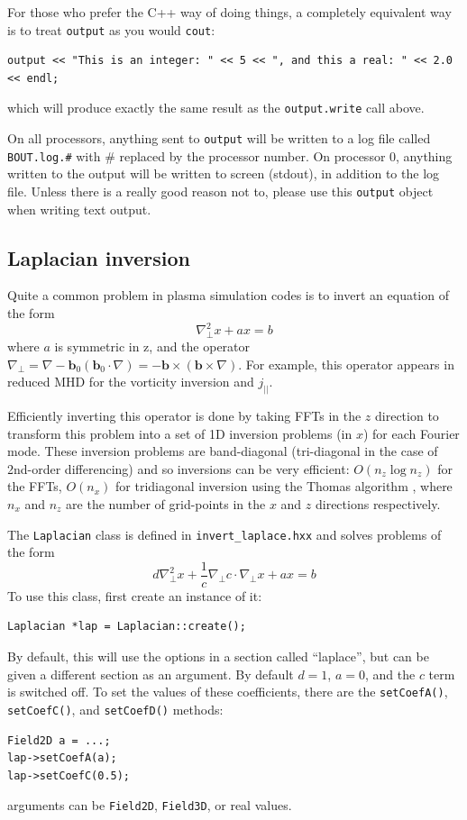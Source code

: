 \documentclass[12pt]{article}
\newcommand{\code}[1]{\texttt{#1}}
\begin{document}
For those who prefer the C++ way of doing things, a completely equivalent way is to
treat \code{output} as you would \code{cout}:
\begin{lstlisting}
output << "This is an integer: " << 5 << ", and this a real: " << 2.0 << endl;
\end{lstlisting}
which will produce exactly the same result as the \code{output.write} call above.

On all processors, anything sent to \code{output} will be written to a log file called
\texttt{BOUT.log.\#} with \# replaced by the processor number. On processor 0, anything
written to the output will be written to screen (stdout), in addition to the log file.
Unless there is a really good reason not to, please use this \code{output} object
when writing text output.

\subsection{Laplacian inversion}
Quite a common problem in plasma simulation codes is to invert an equation of the form
\[
\nabla_\perp^2 x + a x = b
\]
where $a$ is symmetric in z, and the operator $\nabla_\perp = \nabla - 
\mathbf{b}_0\left(\mathbf{b}_0\cdot\nabla\right) = -\mathbf{b\times} 
\left(\mathbf{b\times}\nabla\right)$. For example, this operator
appears in reduced MHD for the vorticity inversion and $j_||$.

Efficiently inverting this operator is done by taking FFTs in the $z$ direction
to transform this problem into a set of 1D inversion problems (in $x$) for each Fourier mode.
These inversion problems are band-diagonal (tri-diagonal in the case of 2nd-order differencing) and so
inversions can be very efficient: $O\left(n_z \log n_z\right)$ for the FFTs, $O\left(n_x\right)$ for tridiagonal inversion
using the Thomas algorithm \cite{press-1999}, where $n_x$ and $n_z$ are the number of grid-points
in the $x$ and $z$ directions respectively.

The \lstinline!Laplacian! class is defined in \texttt{invert\_laplace.hxx} and solves
problems of the form
\[
d\nabla_\perp^2 x + \frac{1}{c}\nabla_\perp c \cdot\nabla_\perp x + a x = b
\]
To use this class, first create an instance of it:
\begin{lstlisting}
Laplacian *lap = Laplacian::create();
\end{lstlisting}
By default, this will use the options in a section called ``laplace'', but can be given
a different section as an argument.
By default $d = 1$, $a = 0$, and the $c$ term is switched off. To set the values of these
coefficients, there are the \lstinline!setCoefA()!, \lstinline!setCoefC()!, and \lstinline!setCoefD()!
methods:
\begin{lstlisting}
Field2D a = ...;
lap->setCoefA(a);
lap->setCoefC(0.5);
\end{lstlisting}
arguments can be \lstinline!Field2D!, \lstinline!Field3D!, or real values.
\end{document}
